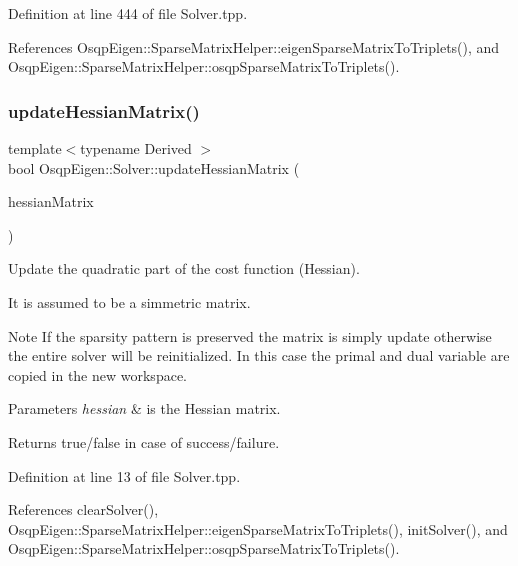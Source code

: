Definition at line 444 of file Solver.\+tpp.



References Osqp\+Eigen\+::\+Sparse\+Matrix\+Helper\+::eigen\+Sparse\+Matrix\+To\+Triplets(), and Osqp\+Eigen\+::\+Sparse\+Matrix\+Helper\+::osqp\+Sparse\+Matrix\+To\+Triplets().

\mbox{\label{classOsqpEigen_1_1Solver_a5ddf094f1eeff686fa8cec802a50f436}} 
\subsubsection{\texorpdfstring{update\+Hessian\+Matrix()}{updateHessianMatrix()}\hspace{0.1cm}{\footnotesize\ttfamily [2/2]}}
{\footnotesize\ttfamily template$<$typename Derived $>$ \\
bool Osqp\+Eigen\+::\+Solver\+::update\+Hessian\+Matrix (\begin{DoxyParamCaption}\item[{const Eigen\+::\+Sparse\+Compressed\+Base$<$ Derived $>$ \&}]{hessian\+Matrix }\end{DoxyParamCaption})}



Update the quadratic part of the cost function (Hessian). 

It is assumed to be a simmetric matrix. \begin{DoxyNote}{Note}
If the sparsity pattern is preserved the matrix is simply update otherwise the entire solver will be reinitialized. In this case the primal and dual variable are copied in the new workspace.
\end{DoxyNote}

\begin{DoxyParams}{Parameters}
{\em hessian} & is the Hessian matrix. \\
\hline
\end{DoxyParams}
\begin{DoxyReturn}{Returns}
true/false in case of success/failure. 
\end{DoxyReturn}


Definition at line 13 of file Solver.\+tpp.



References clear\+Solver(), Osqp\+Eigen\+::\+Sparse\+Matrix\+Helper\+::eigen\+Sparse\+Matrix\+To\+Triplets(), init\+Solver(), and Osqp\+Eigen\+::\+Sparse\+Matrix\+Helper\+::osqp\+Sparse\+Matrix\+To\+Triplets().


